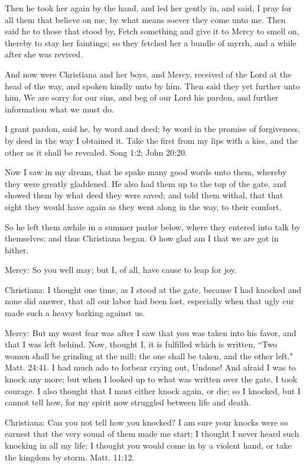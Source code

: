 Then he took her again by the hand, and led her gently in, and said, I pray for all them that believe on me, by what means soever they come unto me. Then said he to those that stood by, Fetch something and give it to Mercy to smell on, thereby to stay her faintings; so they fetched her a bundle of myrrh, and a while after she was revived.

And now were Christiana and her boys, and Mercy, received of the Lord at the head of the way, and spoken kindly unto by him. Then said they yet further unto him, We are sorry for our sins, and beg of our Lord his pardon, and further information what we must do.

I grant pardon, said he, by word and deed; by word in the promise of forgiveness, by deed in the way I obtained it. Take the first from my lips with a kiss, and the other as it shall be revealed. Song 1:2; John 20:20.

Now I saw in my dream, that he spake many good words unto them, whereby they were greatly gladdened. He also had them up to the top of the gate, and showed them by what deed they were saved; and told them withal, that that sight they would have again as they went along in the way, to their comfort.

So he left them awhile in a summer parlor below, where they entered into talk by themselves; and thus Christiana began. O how glad am I that we are got in hither.

Mercy: So you well may; but I, of all, have cause to leap for joy.

Christiana: I thought one time, as I stood at the gate, because I had knocked and none did answer, that all our labor had been lost, especially when that ugly cur made such a heavy barking against us.

Mercy: But my worst fear was after I saw that you was taken into his favor, and that I was left behind. Now, thought I, it is fulfilled which is written, ``Two women shall be grinding at the mill; the one shall be taken, and the other left." Matt. 24:41. I had much ado to forbear crying out, Undone! And afraid I was to knock any more; but when I looked up to what was written over the gate, I took courage. I also thought that I must either knock again, or die; so I knocked, but I cannot tell how, for my spirit now struggled between life and death.

Christiana: Can you not tell how you knocked? I am sure your knocks were so earnest that the very sound of them made me start; I thought I never heard such knocking in all my life; I thought you would come in by a violent hand, or take the kingdom by storm. Matt. 11:12.

